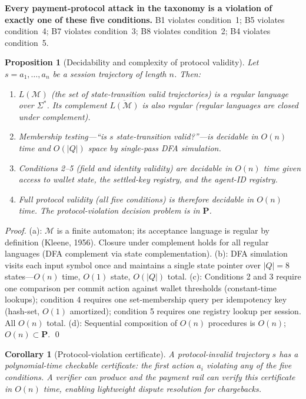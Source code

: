 \documentclass{article}
\newtheorem{proposition}{Proposition}
\newtheorem{corollary}{Corollary}
\begin{document}
\textbf{Every payment-protocol attack in the taxonomy is a violation of exactly one of these five conditions.} B1 violates condition~1; B5 violates condition~4; B7 violates condition~3; B8 violates condition~2; B4 violates condition~5.

\begin{proposition}[Decidability and complexity of protocol validity]
\label{prop:decidability}
Let $s = a_1, \ldots, a_n$ be a session trajectory of length $n$. Then:
\begin{enumerate}
\item[(a)] $L(\mathcal{M})$ (the set of state-transition valid trajectories) is a regular language over $\Sigma^*$. Its complement $\overline{L(\mathcal{M})}$ is also regular (regular languages are closed under complement).
\item[(b)] Membership testing---``is $s$ state-transition valid?''---is decidable in $O(n)$ time and $O(|Q|)$ space by single-pass DFA simulation.
\item[(c)] Conditions 2--5 (field and identity validity) are decidable in $O(n)$ time given access to wallet state, the settled-key registry, and the agent-ID registry.
\item[(d)] Full protocol validity (all five conditions) is therefore decidable in $O(n)$ time. The protocol-violation decision problem is in $\mathbf{P}$.
\end{enumerate}
\end{proposition}

\begin{proof}
(a): $\mathcal{M}$ is a finite automaton; its acceptance language is regular by definition (Kleene, 1956). Closure under complement holds for all regular languages (DFA complement via state complementation). (b): DFA simulation visits each input symbol once and maintains a single state pointer over $|Q| = 8$ states---$O(n)$ time, $O(1)$ state, $O(|Q|)$ total. (c): Conditions 2 and 3 require one comparison per commit action against wallet thresholds (constant-time lookups); condition 4 requires one set-membership query per idempotency key (hash-set, $O(1)$ amortized); condition 5 requires one registry lookup per session. All $O(n)$ total. (d): Sequential composition of $O(n)$ procedures is $O(n)$; $O(n) \subset \mathbf{P}$. \qed
\end{proof}

\begin{corollary}[Protocol-violation certificate]
A protocol-invalid trajectory $s$ has a polynomial-time checkable certificate: the first action $a_i$ violating any of the five conditions. A verifier can produce and the payment rail can verify this certificate in $O(n)$ time, enabling lightweight dispute resolution for chargebacks.
\end{corollary}
\end{document}
